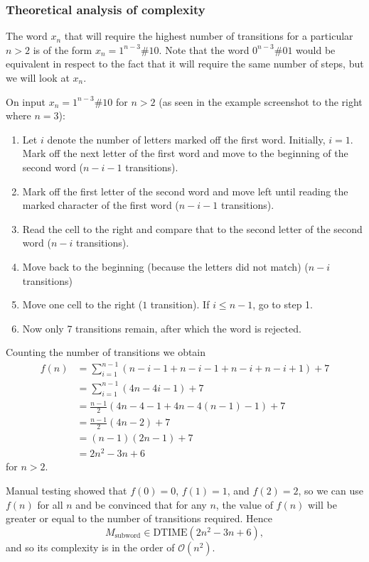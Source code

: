 \subsubsection{Theoretical analysis of complexity}

The word $x_n$ that will require the highest number of transitions for a particular $n>2$ is of the form $x_n=1^{n-3} \# 1 0$. Note that the word $0^{n-3} \#  0 1$ would be equivalent in respect to the fact that it will require the same number of steps, but we will look at $x_n$.

On input $x_n=1^{n-3} \# 1 0$ for $n>2$ (as seen in the example screenshot to the right where $n=3$):
\begin{enumerate}
    \item Let $i$ denote the number of letters marked off the first word. Initially, $i=1$. Mark off the next letter of the first word and move to the beginning of the second word ($n-i-1$ transitions).
    \item Mark off the first letter of the second word and move left until reading the marked character of the first word ($n-i-1$ transitions). 
    \item Read the cell to the right and compare that to the second letter of the second word ($n-i$ transitions).
    \item Move back to the beginning (because the letters did not match) ($n-i$ transitions)
    \item Move one cell to the right ($1$ transition). If $i \leq n-1$, go to step 1.
    \item Now only 7 transitions remain, after which the word is rejected.
\end{enumerate}

Counting the number of transitions we obtain
\begin{align*}
    f(n)
        &= \sum_{i=1}^{n-1}(n-i-1+n-i-1+n-i+n-i+1) + 7 \\
        &= \sum_{i=1}^{n-1}(4n -4i-1) + 7 \\
        &= \frac{n-1}{2}(4n-4-1+4n-4(n-1)-1) + 7 \\
        &= \frac{n-1}{2}(4n-2) + 7 \\
        &= (n-1)(2n-1)+7 \\
        &= 2n^2 - 3n + 6
\end{align*}
for $n>2$. 

Manual testing showed that $f(0)=0$, $f(1)=1$, and $f(2)=2$, so we can use $f(n)$ for all $n$ and be convinced that for any $n$, the value of $f(n)$ will be greater or equal to the number of transitions required. Hence
$$ M_\text{subword} \in \text{DTIME}(2n^2 - 3n + 6), $$
and so its complexity is in the order of $\mathcal{O}(n^2)$.

